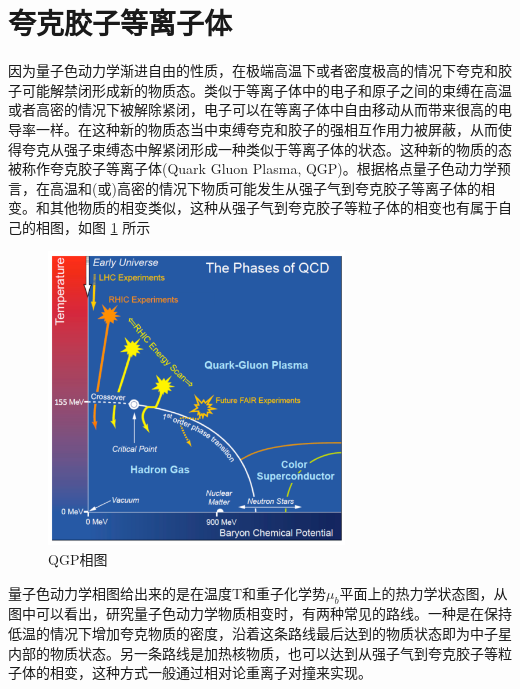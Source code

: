 \section{夸克胶子等离子体}
\label{夸克胶子等离子体}
因为量子色动力学渐进自由的性质，在极端高温下或者密度极高的情况下夸克和胶子可能解禁闭形成新的物质态。类似于等离子体中的电子和原子之间的束缚在高温或者高密的情况下被解除紧闭，电子可以在等离子体中自由移动从而带来很高的电导率一样。在这种新的物质态当中束缚夸克和胶子的强相互作用力被屏蔽，从而使得夸克从强子束缚态中解紧闭形成一种类似于等离子体的状态。这种新的物质的态被称作夸克胶子等离子体(Quark Gluon Plasma, QGP)。根据格点量子色动力学预言，在高温和(或)高密的情况下物质可能发生从强子气到夸克胶子等离子体的相变。和其他物质的相变类似，这种从强子气到夸克胶子等粒子体的相变也有属于自己的相图，如图 \ref{fig:PhaseDiagram} 所示

\begin{figure}[htb]
    \begin{center}
    \includegraphics[width=0.7\textwidth,clip]{figures/Chapter1/PhaseDiagram.png}
    \end{center}
    \caption[QGP相图]{QGP相图}
    \label{fig:PhaseDiagram}
\end{figure}

量子色动力学相图给出来的是在温度T和重子化学势$\mu_b$平面上的热力学状态图，从图中可以看出，研究量子色动力学物质相变时，有两种常见的路线。一种是在保持低温的情况下增加夸克物质的密度，沿着这条路线最后达到的物质状态即为中子星内部的物质状态。另一条路线是加热核物质，也可以达到从强子气到夸克胶子等粒子体的相变，这种方式一般通过相对论重离子对撞来实现。